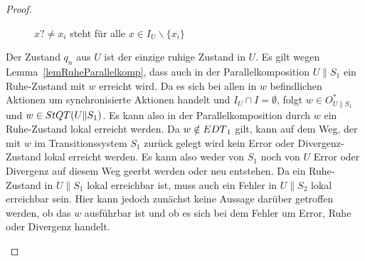 \begin{proof}
\begin{itemize}
\begin{figure} [h!tbp]
\begin{center}
        \caption{$x?\neq x_i$ steht für alle $x\in I_U\backslash\{x_i\}$}
\label{UohneEmitIundO}
      \end{center}
      \end{figure}
      Der Zustand $q_n$ aus $U$ ist der einzige ruhige Zustand in $U$.
      Es gilt wegen Lemma~\ref{lemRuheParallelkomp}, dass auch in der
      Parallelkomposition $U\|S_1$ ein Ruhe-Zustand mit $w$ erreicht wird. Da
      es sich bei allen in $w$ befindlichen Aktionen um synchronisierte
      Aktionen handelt und $I_U\cap I=\emptyset$, folgt $w\in O_{U\|S_1}^*$ und
      $w\in StQT{}(U\|S_1)$. Es kann also in der Parallelkomposition durch $w$
      ein Ruhe-Zustand lokal erreicht werden. Da $w\notin EDT{}_1$ gilt, kann
      auf dem Weg, der mit $w$ im Transitionssystem $S_1$ zurück gelegt wird
      kein Error oder Divergenz-Zustand lokal erreicht werden. Es kann also
      weder von $S_1$ noch von $U$ Error oder Divergenz auf diesem Weg geerbt
      werden oder neu entstehen. Da ein Ruhe-Zustand in $U\|S_1$ lokal
      erreichbar ist, muss auch ein Fehler in $U\|S_2$ lokal erreichbar sein.
      Hier kann jedoch zunächst keine Aussage darüber getroffen werden, ob das
      $w$ ausführbar ist und ob es sich bei dem Fehler um Error, Ruhe oder
      Divergenz handelt.
\end{itemize}
\end{proof}
